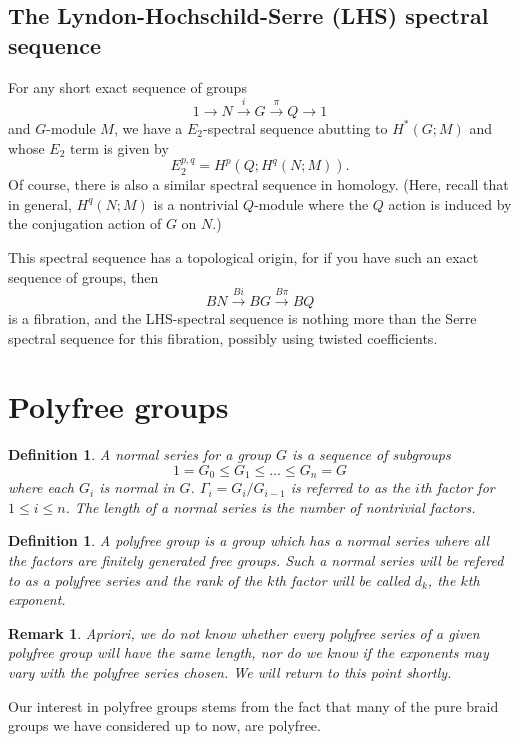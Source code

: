 \documentclass{amsart}
\newtheorem{rem}[thm]{Remark}
\newtheorem{defn}[thm]{Definition}
\begin{document}
\subsection{The Lyndon-Hochschild-Serre (LHS) spectral sequence}
For any short exact sequence of groups
$$
1 \rightarrow N \overset{i}{\rightarrow} G \overset{\pi}{\rightarrow}
 Q \rightarrow 1
$$
and $G$-module $M$, we have a $E_2$-spectral sequence abutting to 
$H^*(G;M)$ and whose $E_2$ term is given by
$$
E_2^{p,q} = H^p(Q;H^q(N;M)).
$$
Of course, there is also a similar spectral sequence in homology.
(Here, recall that in general, $H^q(N;M)$ is a nontrivial
$Q$-module where the $Q$ action is induced by the conjugation
action of $G$ on $N$.)

This spectral sequence has a topological origin, for if you have
such an exact sequence of groups, then 
$$
BN \overset{Bi}{\rightarrow} BG \overset{B\pi}{\rightarrow} BQ
$$
is a fibration, and the LHS-spectral sequence is nothing more than the
Serre spectral sequence for this fibration, possibly using twisted coefficients.

\section{Polyfree groups}

\begin{defn}
\label{defn: normalseries}
A normal series for a group $G$ is a sequence of subgroups 
$$
1=G_0 \le G_1 \le \dots \le G_n=G
$$
where each $G_i$ is normal in $G$. $\Gamma_i=G_i/G_{i-1}$ 
is referred to as the $i$th factor for $1 \leq i \leq n$. 
The length of a normal series is 
the number of nontrivial factors.
\end{defn}

\begin{defn}
A polyfree group is a group which has a normal series where all the factors
are finitely generated free groups. Such a normal series will be refered to
as a polyfree series and the rank of the $k$th factor will be called $d_k$,
the $k$th exponent.
\end{defn}

\begin{rem}
Apriori, we do not know whether every polyfree series of a given polyfree group
will have the same length, nor do we know if the exponents may vary with
the polyfree series chosen.
We will return to this point shortly.
\end{rem}

Our interest in polyfree groups stems from the fact that many of the pure
braid groups we have considered up to now, are polyfree.
\end{document}
